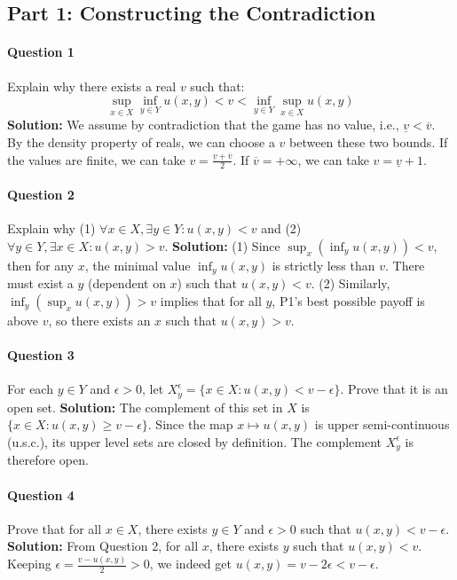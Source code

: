 \subsection{Part 1: Constructing the Contradiction}

\paragraph{Question 1} Explain why there exists a real $v$ such that:
$$ \sup_{x \in X} \inf_{y \in Y} u(x,y) < v < \inf_{y \in Y} \sup_{x \in X} u(x,y) $$
\textbf{Solution:} We assume by contradiction that the game has no value, i.e., $\underline{v} < \overline{v}$. By the density property of reals, we can choose a $v$ between these two bounds. If the values are finite, we can take $v = \frac{\underline{v} + \overline{v}}{2}$. If $\overline{v} = +\infty$, we can take $v = \underline{v} + 1$.

\paragraph{Question 2} Explain why (1) $\forall x \in X, \exists y \in Y : u(x,y) < v$ and (2) $\forall y \in Y, \exists x \in X : u(x,y) > v$.
\textbf{Solution:} 
(1) Since $\sup_x (\inf_y u(x,y)) < v$, then for any $x$, the minimal value $\inf_y u(x,y)$ is strictly less than $v$. There must exist a $y$ (dependent on $x$) such that $u(x,y) < v$. 
(2) Similarly, $\inf_y (\sup_x u(x,y)) > v$ implies that for all $y$, P1's best possible payoff is above $v$, so there exists an $x$ such that $u(x,y) > v$.

\paragraph{Question 3} For each $y \in Y$ and $\epsilon > 0$, let $X_y^\epsilon = \{x \in X : u(x,y) < v - \epsilon\}$. Prove that it is an open set.
\textbf{Solution:} The complement of this set in $X$ is $\{x \in X : u(x,y) \geq v - \epsilon\}$. Since the map $x \mapsto u(x,y)$ is upper semi-continuous (u.s.c.), its upper level sets are closed by definition. The complement $X_y^\epsilon$ is therefore open.

\paragraph{Question 4} Prove that for all $x \in X$, there exists $y \in Y$ and $\epsilon > 0$ such that $u(x,y) < v - \epsilon$.
\textbf{Solution:} From Question 2, for all $x$, there exists $y$ such that $u(x,y) < v$. Keeping $\epsilon = \frac{v - u(x,y)}{2} > 0$, we indeed get $u(x,y) = v - 2\epsilon < v - \epsilon$.

